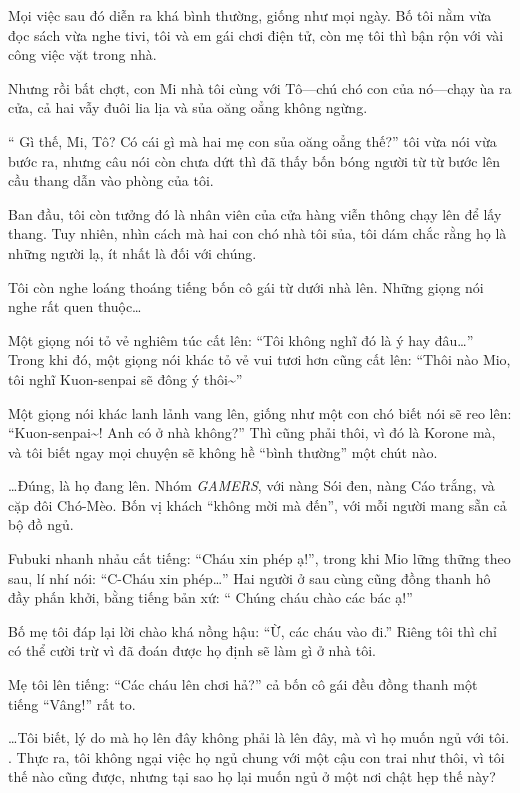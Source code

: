 \documentclass[../main.tex]{subfiles}
\begin{document}
Mọi việc sau đó diễn ra khá bình thường, giống như mọi ngày. Bố tôi nằm vừa đọc sách vừa nghe tivi, tôi và em gái chơi điện tử, còn mẹ tôi thì bận rộn với vài công việc vặt trong nhà.

Nhưng rồi bất chợt, con Mi nhà tôi cùng với Tô—chú chó con của nó—chạy ùa ra cửa, cả hai vẫy đuôi lia lịa và sủa oăng oẳng không ngừng.

``{\color{red} Gì thế, Mi, Tô? Có cái gì mà hai mẹ con sủa oăng oẳng thế?}'' tôi vừa nói vừa bước ra, nhưng câu nói còn chưa dứt thì đã thấy bốn bóng người từ từ bước lên cầu thang dẫn vào phòng của tôi.

Ban đầu, tôi còn tưởng đó là nhân viên của cửa hàng viễn thông chạy lên để lấy thang. Tuy nhiên, nhìn cách mà hai con chó nhà tôi sủa, tôi dám chắc rằng họ là những người lạ, ít nhất là đối với chúng.

Tôi còn nghe loáng thoáng tiếng bốn cô gái từ dưới nhà lên. Những giọng nói nghe rất quen thuộc\dots

Một giọng nói tỏ vẻ nghiêm túc cất lên: ``Tôi không nghĩ đó là ý hay đâu\dots'' Trong khi đó, một giọng nói khác tỏ vẻ vui tươi hơn cũng cất lên: ``Thôi nào Mio, tôi nghĩ Kuon-senpai sẽ đông ý thôi\~{}''

Một giọng nói khác lanh lảnh vang lên, giống như một con chó biết nói sẽ reo lên: ``Kuon-senpai\~{}! Anh có ở nhà không?'' Thì cũng phải thôi, vì đó là Korone mà, và tôi biết ngay mọi chuyện sẽ không hề ``bình thường'' một chút nào.

\dots Đúng, là họ đang lên. Nhóm \textit{GAMERS}, với nàng Sói đen, nàng Cáo trắng, và cặp đôi Chó-Mèo. Bốn vị khách ``không mời mà đến'', với mỗi người mang sẵn cả bộ đồ ngủ.

Fubuki nhanh nhảu cất tiếng: ``Cháu xin phép ạ!'', trong khi Mio lững thững theo sau, lí nhí nói: ``C-Cháu xin phép\dots'' Hai người ở sau cùng cũng đồng thanh hô đầy phấn khởi, bằng tiếng bản xứ: ``{\color{red} Chúng cháu chào các bác ạ!}''

Bố mẹ tôi đáp lại lời chào khá nồng hậu: ``Ừ, các cháu vào đi.'' Riêng tôi thì chỉ có thể cười trừ vì đã đoán được họ định sẽ làm gì ở nhà tôi.

Mẹ tôi lên tiếng: ``Các cháu lên chơi hả?'' cả bốn cô gái đều đồng thanh một tiếng ``Vâng!'' rất to.

\dots Tôi biết, lý do mà họ lên đây không phải là lên đây, mà vì họ muốn ngủ với tôi. . Thực ra, tôi không ngại việc họ ngủ chung với một cậu con trai như thôi, vì tôi thế nào cũng được, nhưng tại sao họ lại muốn ngủ ở một nơi chật hẹp thế này?
\end{document}
